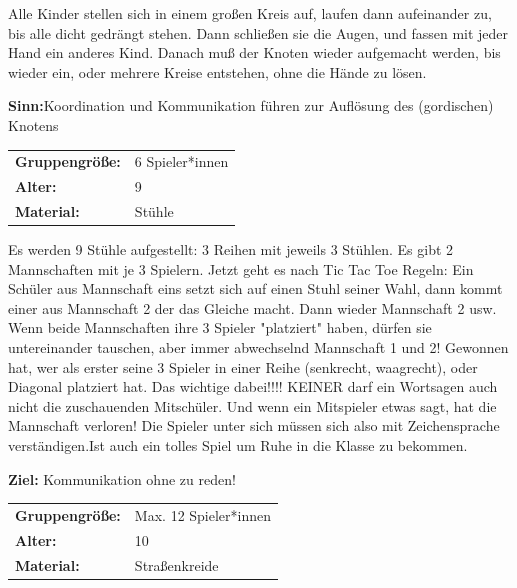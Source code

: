 Alle Kinder stellen sich in einem großen Kreis auf, laufen dann aufeinander zu, bis alle dicht gedrängt stehen. Dann schließen sie die Augen, und fassen mit jeder Hand ein anderes Kind. Danach muß der Knoten wieder aufgemacht werden, bis wieder ein, oder mehrere Kreise entstehen, ohne die Hände zu lösen.

\textbf{Sinn:}Koordination und Kommunikation führen zur Auflösung des (gordischen) Knotens


\begin{table}[H]
\begin{tabular}{>{\bfseries}lp{8cm}}
   Gruppengröße:   & 6 Spieler*innen\\
    Alter: & 9 \\
    Material: & Stühle \\ 
\end{tabular}
\end{table} 

Es werden 9 Stühle aufgestellt: 3 Reihen mit jeweils 3 Stühlen. Es gibt 2 Mannschaften mit je 3 Spielern. Jetzt geht es nach Tic Tac Toe Regeln: Ein Schüler aus Mannschaft eins setzt sich auf einen Stuhl seiner Wahl, dann kommt einer aus Mannschaft 2 der das Gleiche macht. Dann wieder Mannschaft 2 usw. Wenn beide Mannschaften ihre 3 Spieler "platziert" haben, dürfen sie untereinander tauschen, aber immer abwechselnd Mannschaft 1 und 2! Gewonnen hat, wer als erster seine 3 Spieler in einer Reihe (senkrecht, waagrecht), oder Diagonal platziert hat. Das wichtige dabei!!!! KEINER darf ein Wortsagen auch nicht die zuschauenden Mitschüler. Und wenn ein Mitspieler etwas sagt, hat die Mannschaft verloren! Die Spieler unter sich müssen sich also mit Zeichensprache verständigen.Ist auch ein tolles Spiel um Ruhe in die Klasse zu bekommen.

\textbf{Ziel:} Kommunikation ohne zu reden!
\\
\newpage
\begin{table}[H]
\begin{tabular}{>{\bfseries}lp{8cm}}
   Gruppengröße:   & Max. 12 Spieler*innen\\
    Alter: & 10 \\
    Material: & Straßenkreide \\ 
\end{tabular}
\end{table} 


